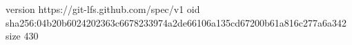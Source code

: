 version https://git-lfs.github.com/spec/v1
oid sha256:04b20b6024202363c6678233974a2de66106a135cd67200b61a816c277a6a342
size 430
